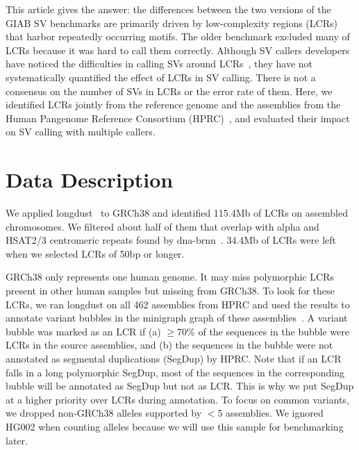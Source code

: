 \documentclass[a4paper,num-refs]{oup-contemporary}
\begin{document}
This article gives the answer:
the differences between the two versions of the GIAB SV benchmarks
are primarily driven by low-complexity regions (LCRs) that harbor repeatedly occurring motifs.
The older benchmark excluded many of LCRs because it was hard to call them correctly.
Although SV callers developers have noticed the difficulties in calling SVs around LCRs~\cite{Zook:2020aa,Smolka:2024ab,Keskus:2025aa},
they have not systematically quantified the effect of LCRs in SV calling.
There is not a consensus on the number of SVs in LCRs or the error rate of them.
Here, we identified LCRs jointly from the reference genome
and the assemblies from the Human Pangenome Reference Consortium (HPRC)~\cite{Liao:2023aa},
and evaluated their impact on SV calling with multiple callers.


\section{Data Description}


We applied longdust~\cite{Li:2025aa} to GRCh38 and identified 115.4Mb of LCRs on assembled chromosomes.
We filtered about half of them that overlap with alpha and HSAT2/3 centromeric repeats found by dna-brnn~\cite{Li:2019aa}.
34.4Mb of LCRs were left when we selected LCRs of 50bp or longer.

GRCh38 only represents one human genome.
It may miss polymorphic LCRs present in other human samples but missing from GRCh38.
To look for these LCRs, we ran longdust on all 462 assemblies from HPRC
and used the results to annotate variant bubbles in the minigraph graph of these assemblies~\cite{Li:2020aa}.
A variant bubble was marked as an LCR if (a) $\ge$70\% of the sequences in the bubble were LCRs in the source assemblies, and
(b) the sequences in the bubble were not annotated as segmental duplications (SegDup) by HPRC.
Note that if an LCR falls in a long polymorphic SegDup, most of the sequences in the corresponding bubble will be annotated as SegDup but not as LCR.
This is why we put SegDup at a higher priority over LCRs during annotation.
To focus on common variants, we dropped non-GRCh38 alleles supported by $<$5 assemblies.
We ignored HG002 when counting alleles because we will use this sample for benchmarking later.
\end{document}

